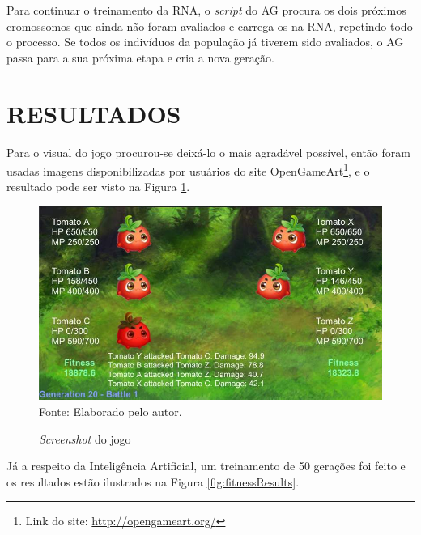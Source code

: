 \documentclass[12pt,a4paper]{article}
\newcommand{\source}[1]{\small Fonte: {#1}}
\begin{document}
	Para continuar o treinamento da RNA,
	o \textit{script} do AG procura os dois próximos cromossomos que ainda não foram avaliados e carrega-os na RNA,
	repetindo todo o processo.
	Se todos os indivíduos da população já tiverem sido avaliados,
	o AG passa para a sua próxima etapa e cria a nova geração.


\FloatBarrier
\newpage %
\section{RESULTADOS}

	Para o visual do jogo procurou-se deixá-lo o mais agradável possível,
	então foram usadas imagens disponibilizadas por usuários do site OpenGameArt\footnote{Link do site: \url{http://opengameart.org/}},
	e o resultado pode ser visto na Figura \ref{fig:gameScreenshot}.

	\begin{figure}[ht!]
		\centering
		\caption{\textit{Screenshot} do jogo}
		\includegraphics[scale=0.6]{GameScreenshot.jpg}\\
		\vspace{0.5mm}
		\source{Elaborado pelo autor.}
		\label{fig:gameScreenshot}
	\end{figure}

	Já a respeito da Inteligência Artificial,
	um treinamento de 50 gerações foi feito e os resultados estão ilustrados na Figura \ref{fig:fitnessResults}.
	
\end{document}
